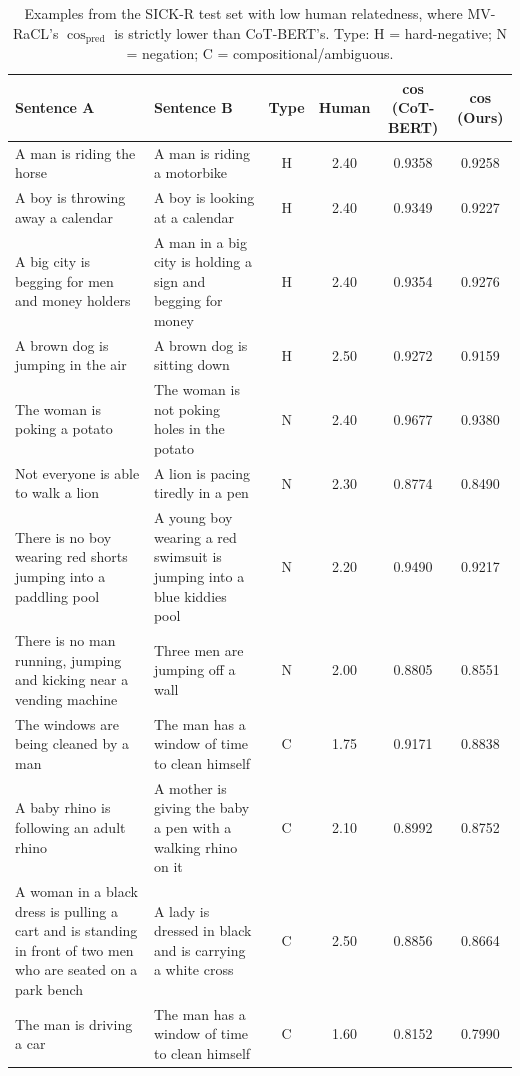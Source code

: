 \documentclass[lettersize,journal]{IEEEtran}
\begin{document}
\begin{table}[!htbp]
\centering
\caption{Examples from the SICK-R test set with low human relatedness, where MV-RaCL's $\cos_{\mathrm{pred}}$ is strictly lower than CoT-BERT's. Type: H = hard-negative; N = negation; C = compositional/ambiguous.}
\label{tab:cases}
\small
\setlength{\tabcolsep}{2pt}
\renewcommand{\arraystretch}{1.05}
\begin{tabular}{p{}p{}cccc}
\toprule
Sentence A & Sentence B & Type & Human & cos (CoT-BERT) & cos (Ours) \\
\midrule
A man is riding the horse & A man is riding a motorbike & H & 2.40 & 0.9358 & 0.9258 \\
A boy is throwing away a calendar & A boy is looking at a calendar & H & 2.40 & 0.9349 & 0.9227 \\
A big city is begging for men and money holders & A man in a big city is holding a sign and begging for money & H & 2.40 & 0.9354 & 0.9276 \\
A brown dog is jumping in the air & A brown dog is sitting down & H & 2.50 & 0.9272 & 0.9159 \\
The woman is poking a potato & The woman is not poking holes in the potato & N & 2.40 & 0.9677 & 0.9380 \\
Not everyone is able to walk a lion & A lion is pacing tiredly in a pen & N & 2.30 & 0.8774 & 0.8490 \\
There is no boy wearing red shorts jumping into a paddling pool & A young boy wearing a red swimsuit is jumping into a blue kiddies pool & N & 2.20 & 0.9490 & 0.9217 \\
There is no man running, jumping and kicking near a vending machine & Three men are jumping off a wall & N & 2.00 & 0.8805 & 0.8551 \\
The windows are being cleaned by a man & The man has a window of time to clean himself & C & 1.75 & 0.9171 & 0.8838 \\
A baby rhino is following an adult rhino & A mother is giving the baby a pen with a walking rhino on it & C & 2.10 & 0.8992 & 0.8752 \\
A woman in a black dress is pulling a cart and is standing in front of two men who are seated on a park bench & A lady is dressed in black and is carrying a white cross & C & 2.50 & 0.8856 & 0.8664 \\
The man is driving a car & The man has a window of time to clean himself & C & 1.60 & 0.8152 & 0.7990 \\
\bottomrule
\end{tabular}
\end{table}
\end{document}
